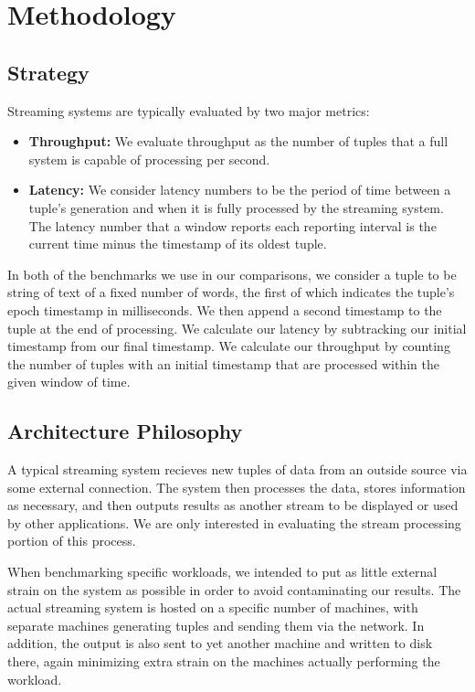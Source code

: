 \section{Methodology}
\subsection{Strategy}
Streaming systems are typically evaluated by two major metrics:
\begin{itemize}
\item \textbf{Throughput:} We evaluate throughput as the number of tuples that a full system is capable of processing per second.
\item \textbf{Latency:} We consider latency numbers to be the period of time between a tuple's generation and when it is fully processed by the streaming system.  The latency number that a window reports each reporting interval is the current time minus the timestamp of its oldest tuple.
\end{itemize}

In both of the benchmarks we use in our comparisons, we consider a tuple to be string of text of a fixed number of words, the first of which indicates the tuple's epoch timestamp in milliseconds.  We then append a second timestamp to the tuple at the end of processing.  We calculate our latency by subtracking our initial timestamp from our final timestamp.  We calculate our throughput by counting the number of tuples with an initial timestamp that are processed within the given window of time.

\subsection{Architecture Philosophy}
A typical streaming system recieves new tuples of data from an outside source via some external connection.  The system then processes the data, stores information as necessary, and then outputs results as another stream to be displayed or used by other applications.  We are only interested in evaluating the stream processing portion of this process.

When benchmarking specific workloads, we intended to put as little external strain on the system as possible in order to avoid contaminating our results.  The actual streaming system is hosted on a specific number of machines, with separate machines generating tuples and sending them via the network.  In addition, the output is also sent to yet another machine and written to disk there, again minimizing extra strain on the machines actually performing the workload.

